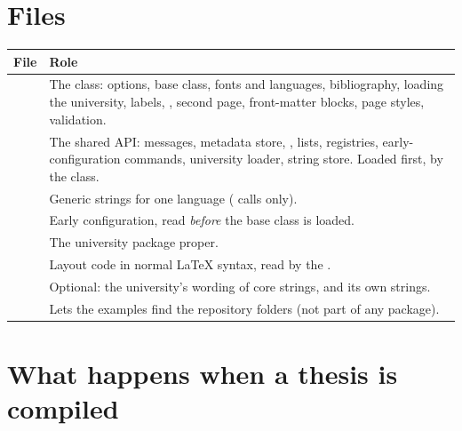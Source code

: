 \section{Files}

\begin{tabularx}{\textwidth}{@{}l Y@{}}
\toprule
\textbf{File} & \textbf{Role} \\
\midrule
{} & The class: options, base class, fonts and languages, bibliography, loading the university, labels, , second page, front-matter blocks, page styles, validation. \\
 & The shared API: messages, metadata store, , lists, registries, early-configuration commands, university loader, string store. Loaded first, by the class. \\
 & Generic strings for one language ( calls only). \\
 & Early configuration, read \emph{before} the base class is loaded. \\
 & The university package proper. \\
 & Layout code in normal \LaTeX{} syntax, read by the . \\
 & Optional: the university's wording of core strings, and its own strings. \\
 & Lets the examples find the repository folders (not part of any package). \\
\bottomrule
\end{tabularx}

\section{What happens when a thesis is compiled}
\label{sec:sequence}

